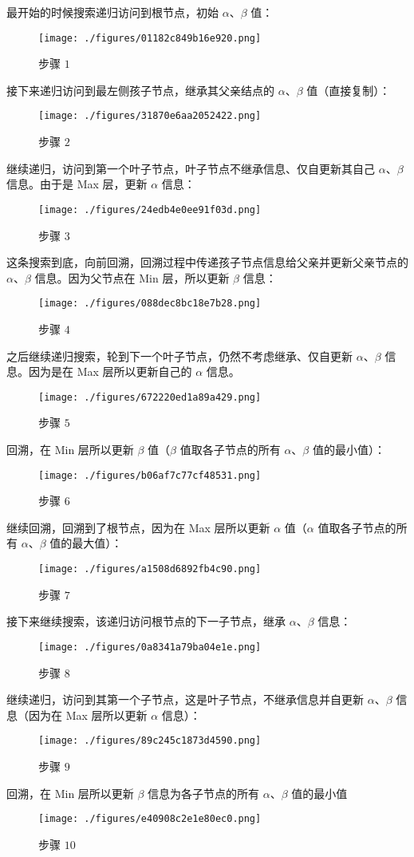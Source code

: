 最开始的时候搜索递归访问到根节点，初始 $\alpha$、$\beta$ 值：
\begin{figure}[ht]
\centering
\texttt{[image: ./figures/01182c849b16e920.png]}
\caption{步骤 $1$} \label{fig_mmsab_22}
\end{figure}
接下来递归访问到最左侧孩子节点，继承其父亲结点的 $\alpha$、$\beta$ 值（直接复制）：
\begin{figure}[ht]
\centering
\texttt{[image: ./figures/31870e6aa2052422.png]}
\caption{步骤 $2$} \label{fig_mmsab_23}
\end{figure}
继续递归，访问到第一个叶子节点，叶子节点不继承信息、仅自更新其自己 $\alpha$、$\beta$ 信息。由于是 Max 层，更新 $\alpha$ 信息：
\begin{figure}[ht]
\centering
\texttt{[image: ./figures/24edb4e0ee91f03d.png]}
\caption{步骤 $3$} \label{fig_mmsab_25}
\end{figure}
这条搜索到底，向前回溯，回溯过程中传递孩子节点信息给父亲并更新父亲节点的 $\alpha$、$\beta$ 信息。因为父节点在 Min 层，所以更新 $\beta$ 信息：
\begin{figure}[ht]
\centering
\texttt{[image: ./figures/088dec8bc18e7b28.png]}
\caption{步骤 $4$} \label{fig_mmsab_26}
\end{figure}
之后继续递归搜索，轮到下一个叶子节点，仍然不考虑继承、仅自更新 $\alpha$、$\beta$ 信息。因为是在 Max 层所以更新自己的 $\alpha$ 信息。
\begin{figure}[ht]
\centering
\texttt{[image: ./figures/672220ed1a89a429.png]}
\caption{步骤 $5$} \label{fig_mmsab_27}
\end{figure}
回溯，在 Min 层所以更新 $\beta$ 值（$\beta$ 值取各子节点的所有 $\alpha$、$\beta$ 值的最小值）：
\begin{figure}[ht]
\centering
\texttt{[image: ./figures/b06af7c77cf48531.png]}
\caption{步骤 $6$} \label{fig_mmsab_28}
\end{figure}
继续回溯，回溯到了根节点，因为在 Max 层所以更新 $\alpha$ 值（$\alpha$ 值取各子节点的所有 $\alpha$、$\beta$ 值的最大值）：
\begin{figure}[ht]
\centering
\texttt{[image: ./figures/a1508d6892fb4c90.png]}
\caption{步骤 $7$} \label{fig_mmsab_31}
\end{figure}
接下来继续搜索，该递归访问根节点的下一子节点，继承 $\alpha$、$\beta$ 信息：
\begin{figure}[ht]
\centering
\texttt{[image: ./figures/0a8341a79ba04e1e.png]}
\caption{步骤 $8$} \label{fig_mmsab_32}
\end{figure}
继续递归，访问到其第一个子节点，这是叶子节点，不继承信息并自更新 $\alpha$、$\beta$ 信息（因为在 Max 层所以更新 $\alpha$ 信息）：
\begin{figure}[ht]
\centering
\texttt{[image: ./figures/89c245c1873d4590.png]}
\caption{步骤 $9$} \label{fig_mmsab_33}
\end{figure}
回溯，在 Min 层所以更新 $\beta$ 信息为各子节点的所有 $\alpha$、$\beta$ 值的最小值
\begin{figure}[ht]
\centering
\texttt{[image: ./figures/e40908c2e1e80ec0.png]}
\caption{步骤 $10$} \label{fig_mmsab_34}
\end{figure}
